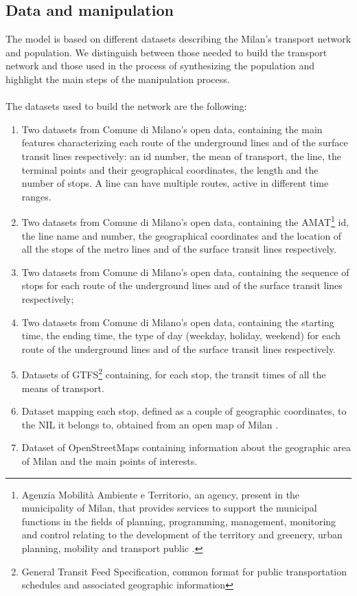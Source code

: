 \subsection{Data and manipulation}\label{sec3}
The model is based on different datasets describing the Milan's transport network and population. We distinguish between those needed to build the transport network and those used in the process of synthesizing the population and highlight the main steps of the manipulation process.\\ \\
The datasets used to build the network are the following:
\begin{enumerate}
    \item Two datasets \cite{site1, site5} from Comune di Milano's open data, containing the main features characterizing each route of the underground lines and  of the surface transit lines respectively: an id number, the mean of transport, the line, the terminal points and their geographical coordinates, the length and the number of stops. A line can have multiple routes, active in different time ranges.  
    \item Two datasets \cite{site2, site6} from Comune di Milano's open data, containing the AMAT\footnote{Agenzia Mobilità Ambiente e Territorio, an agency, present in the municipality of Milan, that provides services to support the municipal functions in the fields of planning, programming, management, monitoring and control relating to the development of the territory and greenery, urban planning, mobility and transport public \cite{site21}.} id, the line name and number, the geographical coordinates and the location of all the stops of the metro lines and of the surface transit lines respectively.
    \item Two datasets \cite{site3, site7} from Comune di Milano's open data, containing the sequence of stops for each route of the underground lines and of the surface transit lines respectively;
    \item Two datasets \cite{site4, site8} from Comune di Milano's open data, containing the starting time, the ending time, the type of day (weekday, holiday, weekend) for each route of the underground lines and  of the surface transit lines respectively. 
    \item Datasets \cite{site12} of GTFS\footnote{General Transit Feed Specification, common format for public transportation schedules and associated geographic information} containing, for each stop, the transit times of all the means of transport. 
    \item Dataset mapping each stop, defined as a couple of geographic coordinates, to the NIL it belongs to, obtained from an open map of Milan \cite{site22}.
    \item Dataset of OpenStreetMaps containing information about the geographic area of Milan and the main points of interests.
\end{enumerate} 
